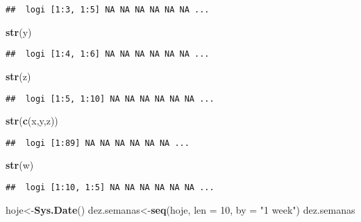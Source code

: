 \documentclass[]{article}
\newenvironment{Shaded}{\begin{snugshade}}{\end{snugshade}}
\newcommand{\KeywordTok}[1]{\textcolor[rgb]{0.13,0.29,0.53}{\textbf{#1}}}
\newcommand{\DataTypeTok}[1]{\textcolor[rgb]{0.13,0.29,0.53}{#1}}
\newcommand{\DecValTok}[1]{\textcolor[rgb]{0.00,0.00,0.81}{#1}}
\newcommand{\StringTok}[1]{\textcolor[rgb]{0.31,0.60,0.02}{#1}}
\newcommand{\NormalTok}[1]{#1}
\begin{document}
\begin{verbatim}
##  logi [1:3, 1:5] NA NA NA NA NA NA ...
\end{verbatim}

\begin{Shaded}
\begin{Highlighting}[]
\KeywordTok{str}\NormalTok{(y)}
\end{Highlighting}
\end{Shaded}

\begin{verbatim}
##  logi [1:4, 1:6] NA NA NA NA NA NA ...
\end{verbatim}

\begin{Shaded}
\begin{Highlighting}[]
\KeywordTok{str}\NormalTok{(z)}
\end{Highlighting}
\end{Shaded}

\begin{verbatim}
##  logi [1:5, 1:10] NA NA NA NA NA NA ...
\end{verbatim}

\begin{Shaded}
\begin{Highlighting}[]
\KeywordTok{str}\NormalTok{(}\KeywordTok{c}\NormalTok{(x,y,z))}
\end{Highlighting}
\end{Shaded}

\begin{verbatim}
##  logi [1:89] NA NA NA NA NA NA ...
\end{verbatim}

\begin{Shaded}
\begin{Highlighting}[]
\KeywordTok{str}\NormalTok{(w)}
\end{Highlighting}
\end{Shaded}

\begin{verbatim}
##  logi [1:10, 1:5] NA NA NA NA NA NA ...
\end{verbatim}

\begin{Shaded}
\begin{Highlighting}[]
\NormalTok{hoje<-}\KeywordTok{Sys.Date}\NormalTok{()}
\NormalTok{dez.semanas<-}\KeywordTok{seq}\NormalTok{(hoje, }\DataTypeTok{len =} \DecValTok{10}\NormalTok{, }\DataTypeTok{by =} \StringTok{"1 week"}\NormalTok{)}
\NormalTok{dez.semanas}
\end{Highlighting}
\end{Shaded}
\end{document}
